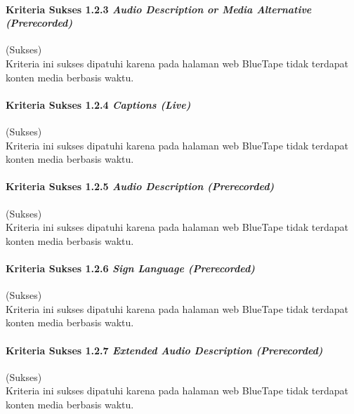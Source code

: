 \paragraph{Kriteria Sukses 1.2.3 \textit{Audio Description or Media Alternative (Prerecorded)}}
\label{par:kepatuhan_bluetape_kriteria_sukses_1.2.3}
(Sukses)\\

Kriteria ini sukses dipatuhi karena pada halaman web BlueTape tidak terdapat konten media berbasis waktu.

\paragraph{Kriteria Sukses 1.2.4 \textit{Captions (Live)}}
\label{par:kepatuhan_bluetape_kriteria_sukses_1.2.4}
(Sukses)\\

Kriteria ini sukses dipatuhi karena pada halaman web BlueTape tidak terdapat konten media berbasis waktu.

\paragraph{Kriteria Sukses 1.2.5 \textit{Audio Description (Prerecorded)}}
\label{par:kepatuhan_bluetape_kriteria_sukses_1.2.5}
(Sukses)\\

Kriteria ini sukses dipatuhi karena pada halaman web BlueTape tidak terdapat konten media berbasis waktu.

\paragraph{Kriteria Sukses 1.2.6 \textit{Sign Language (Prerecorded)}}
\label{par:kepatuhan_bluetape_kriteria_sukses_1.2.6}
(Sukses)\\

Kriteria ini sukses dipatuhi karena pada halaman web BlueTape tidak terdapat konten media berbasis waktu.

\paragraph{Kriteria Sukses 1.2.7 \textit{Extended Audio Description (Prerecorded)}}
\label{par:kepatuhan_bluetape_kriteria_sukses_1.2.7}
(Sukses)\\

Kriteria ini sukses dipatuhi karena pada halaman web BlueTape tidak terdapat konten media berbasis waktu.

